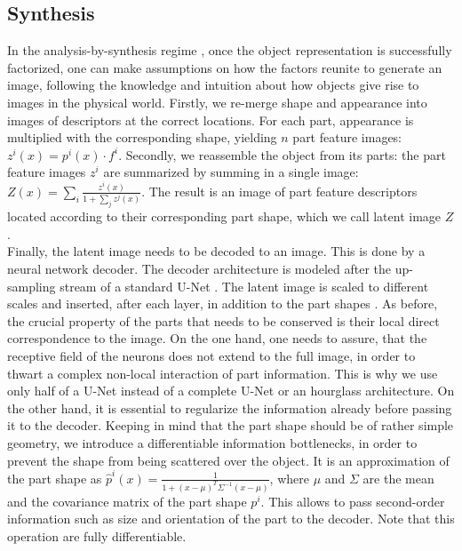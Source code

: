 	\subsection{Synthesis}
	    In the analysis-by-synthesis regime \cite{yildirim15anabysyn}, once the object representation is successfully factorized, one can make assumptions on how the factors reunite to generate an image, following the knowledge and intuition about how objects give rise to images in the physical world.
		Firstly, we re-merge shape and appearance into images of descriptors at the correct locations. For each part, appearance is multiplied with the corresponding shape, yielding $n$ part feature images: $z^i(x) = p^i(x) \cdot f^i$.
		Secondly, we reassemble the object from its parts: the part feature images $z^i$ are summarized by summing in a single image: $ Z(x) = \sum_i \frac{z^i(x)}{1 + \sum_j z^j(x)}$. The result is an image of part feature descriptors located according to their corresponding part shape, which we call latent image $Z$.\\
	
		Finally, the latent image needs to be decoded to an image. This is done by a neural network decoder. The decoder architecture is modeled after the up-sampling stream of a standard U-Net \cite{ronneberger15unet}. The latent image is scaled to different scales  and inserted, after each layer, in addition to the part shapes . As before, the crucial property of the parts that needs to be conserved is their local direct correspondence to the image. On the one hand, one needs to assure, that the receptive field of the neurons does not extend to the full image, in order to thwart a complex non-local interaction of part information. This is why we use only half of a U-Net instead of a complete U-Net or an hourglass architecture.
		On the other hand, it is essential to regularize the information already before passing it to the decoder. Keeping in mind that the part shape should be of rather simple geometry, we introduce a differentiable information bottlenecks, in order to prevent the shape from being scattered over the object. It is an approximation of the part shape as $\hat p^i(x) = \frac{1}{1 + (x -\mu)^T \Sigma^{-1} (x - \mu)}$, where $\mu$ and $\Sigma$ are the mean and the covariance matrix of the part shape $p^i$. This allows to pass second-order information such as size and orientation of the part to the decoder. Note that this operation are fully differentiable.



